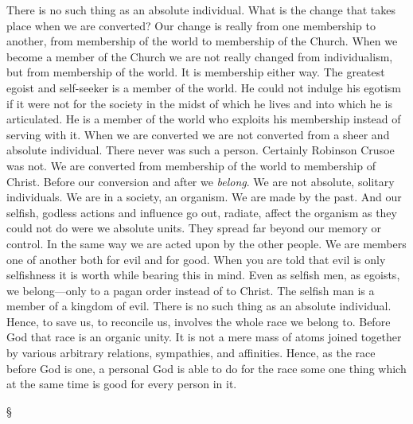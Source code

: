 \documentclass[12pt,letterpaper,oneside]{book}
\begin{document}
There is no such thing as an absolute individual. 
What is the change that takes place 
when we are converted? Our change is really 
from one membership to another, from membership 
of the world to membership of the Church. 
When we become a member of the Church we are 
not really changed from individualism, but from 
membership of the world. It is membership 
either way. The greatest egoist and self-seeker 
is a member of the world. He could not indulge 
his egotism if it were not for the society in the 
midst of which he lives and into which he is 
articulated. He is a member of the world who 
exploits his membership instead of serving with 
it. When we are converted we are not converted 
from a sheer and absolute individual. 
There never was such a person. Certainly 
Robinson Crusoe was not. We are converted 
from membership of the world to membership 
of Christ. Before our conversion and after 
we \textit{belong}. We are not absolute, solitary individuals. 
We are in a society, an organism. 
We are made by the past. And our selfish, 
godless actions and influence go out, radiate, 
affect the organism as they could not do were 
we absolute units. They spread far beyond our 
memory or control. In the same way we are 
acted upon by the other people. We are members 
one of another both for evil and for good. 
When you are told that evil is only selfishness it 
is worth while bearing this in mind. Even as selfish 
men, as egoists, we belong---only to a pagan 
order instead of to Christ. The selfish man is a 
member of a kingdom of evil. There is no such 
thing as an absolute individual. Hence, to save 
us, to reconcile us, involves the whole race we 
belong to. Before God that race is an organic 
unity. It is not a mere mass of atoms joined 
together by various arbitrary relations, sympathies, 
and affinities. Hence, as the race before 
God is one, a personal God is able to do for the 
race some one thing which at the same time is 
good for every person in it. 

\begin{center}
\S
\end{center}
\end{document}
